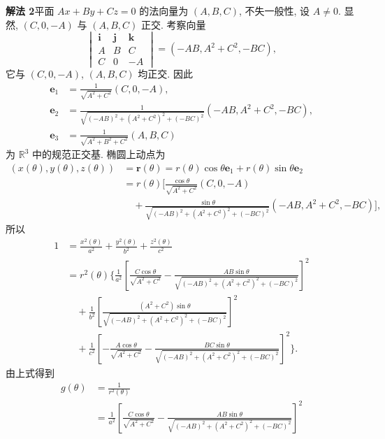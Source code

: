 \begin{solution}
\textbf{解法 2}\quad 平面 $Ax + By + Cz = 0$ 的法向量为 $(A, B, C)$, 不失一般性, 设 $A \neq 0$. 显然, $(C, 0, -A)$ 与 $(A, B, C)$ 正交. 考察向量
\[
  \begin{vmatrix}
    \boldsymbol{i} & \boldsymbol{j} & \boldsymbol{k} \\
    A & B & C \\
    C & 0 & -A
  \end{vmatrix}
  = (-AB, A^{2} + C^{2}, -BC),
\]
它与 $(C, 0, -A)$, $(A, B, C)$ 均正交. 因此
\begin{align*}
  \boldsymbol{e}_{1} &= \frac{1}{\sqrt{A^{2} + C^{2}}}(C, 0, -A), \\
  \boldsymbol{e}_{2} &= \frac{1}{\sqrt{(-AB)^{2} + (A^{2} + C^{2})^{2} + (-BC)^{2}}}(-AB, A^{2} + C^{2}, -BC), \\
  \boldsymbol{e}_{3} &= \frac{1}{\sqrt{A^{2} + B^{2} + C^{2}}}(A, B, C)
\end{align*}
为 $\mathbb{R}^{3}$ 中的规范正交基. 椭圆上动点为
\begin{align*}
  (x(\theta), y(\theta), z(\theta)) &= \boldsymbol{r}(\theta) = r(\theta)\cos\theta \boldsymbol{e}_{1} + r(\theta)\sin\theta \boldsymbol{e}_{2} \\
  &= r(\theta)\biggl[\frac{\cos\theta}{\sqrt{A^{2} + C^{2}}}(C, 0, -A) \\
  &\quad + \frac{\sin\theta}{\sqrt{(-AB)^{2} + (A^{2} + C^{2})^{2} + (-BC)^{2}}}(-AB, A^{2} + C^{2}, -BC)\biggr],
\end{align*}
所以
\begin{align*}
  1 &= \frac{x^{2}(\theta)}{a^{2}} + \frac{y^{2}(\theta)}{b^{2}} + \frac{z^{2}(\theta)}{c^{2}} \\
  &= r^{2}(\theta)\Biggl\{\frac{1}{a^{2}}\left[\frac{C\cos\theta}{\sqrt{A^{2} + C^{2}}} - \frac{AB\sin\theta}{\sqrt{(-AB)^{2} + (A^{2} + C^{2})^{2} + (-BC)^{2}}}\right]^{2} \\
  &\quad + \frac{1}{b^{2}}\left[\frac{(A^{2} + C^{2})\sin\theta}{\sqrt{(-AB)^{2} + (A^{2} + C^{2})^{2} + (-BC)^{2}}}\right]^{2} \\
  &\quad + \frac{1}{c^{2}}\left[-\frac{A\cos\theta}{\sqrt{A^{2} + C^{2}}} - \frac{BC\sin\theta}{\sqrt{(-AB)^{2} + (A^{2} + C^{2})^{2} + (-BC)^{2}}}\right]^{2}\Biggr\}.
\end{align*}
由上式得到
\begin{align*}
  g(\theta) &= \frac{1}{r^{2}(\theta)} \\
  &= \frac{1}{a^{2}}\left[\frac{C\cos\theta}{\sqrt{A^{2} + C^{2}}} - \frac{AB\sin\theta}{\sqrt{(-AB)^{2} + (A^{2} + C^{2})^{2} + (-BC)^{2}}}\right]^{2} \\

\end{align*}
\end{solution}
